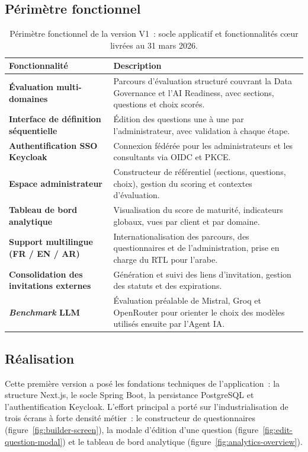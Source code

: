 \documentclass[12pt,a4paper]{report}
\begin{document}
\subsection*{Périmètre fonctionnel}
\begin{table}[H]
\centering
\caption{Périmètre fonctionnel de la version V1~: socle applicatif et fonctionnalités cœur livrées au 31 mars 2026.}
\begin{tabularx}{\textwidth}{>{\bfseries}L{4.6cm}Y}
\toprule
Fonctionnalité & Description \\
\midrule
Évaluation multi-domaines & Parcours d'évaluation structuré couvrant la Data Governance et l'AI Readiness, avec sections, questions et choix scorés. \\
Interface de définition séquentielle & Édition des questions une à une par l'administrateur, avec validation à chaque étape. \\
Authentification SSO Keycloak & Connexion fédérée pour les administrateurs et les consultants via OIDC et PKCE. \\
Espace administrateur & Constructeur de référentiel (sections, questions, choix), gestion du scoring et contextes d'évaluation. \\
Tableau de bord analytique & Visualisation du score de maturité, indicateurs globaux, vues par client et par domaine. \\
Support multilingue (FR / EN / AR) & Internationalisation des parcours, des questionnaires et de l'administration, prise en charge du RTL pour l'arabe. \\
Consolidation des invitations externes & Génération et suivi des liens d'invitation, gestion des statuts et des expirations. \\
\textit{Benchmark} LLM & Évaluation préalable de Mistral, Groq et OpenRouter pour orienter le choix des modèles utilisés ensuite par l'Agent IA. \\
\bottomrule
\end{tabularx}
\label{tab:v1}
\end{table}

\subsection*{Réalisation}
Cette première version a posé les fondations techniques de l'application~: la structure Next.js, le socle Spring Boot, la persistance PostgreSQL et l'authentification Keycloak. L'effort principal a porté sur l'industrialisation de trois écrans à forte densité métier~: le constructeur de questionnaires (figure~\ref{fig:builder-screen}), la modale d'édition d'une question (figure~\ref{fig:edit-question-modal}) et le tableau de bord analytique (figure~\ref{fig:analytics-overview}).
\end{document}
